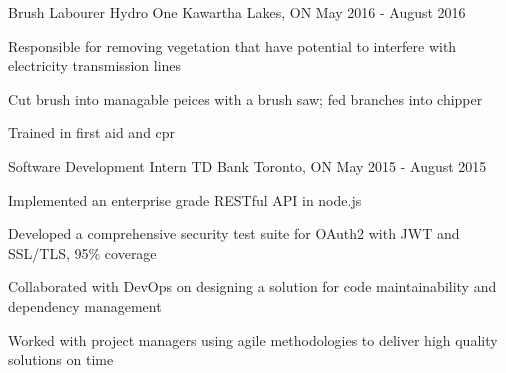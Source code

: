 

\begin{cventries}

  \cventry
    {Brush Labourer} %
    {Hydro One} %
    {Kawartha Lakes, ON} %
    {May 2016 - August 2016} %
    {
      \begin{cvitems} %
        \item {Responsible for removing vegetation that have potential to interfere with electricity transmission lines}
        \item {Cut brush into managable peices with a brush saw; fed branches into chipper}
        \item {Trained in first aid and cpr}
      \end{cvitems}
    }

  \cventry
    {Software Development Intern} %
    {TD Bank} %
    {Toronto, ON} %
    {May 2015 - August 2015} %
    {
      \begin{cvitems} %
        \item {Implemented an enterprise grade RESTful API in node.js}
        \item {Developed a comprehensive security test suite for OAuth2 with JWT and SSL/TLS, 95\% coverage}
        \item {Collaborated with DevOps on designing a solution for code maintainability and dependency management}
        \item {Worked with project managers using agile methodologies to deliver high quality solutions on time}
      \end{cvitems}
    }


\end{cventries}
